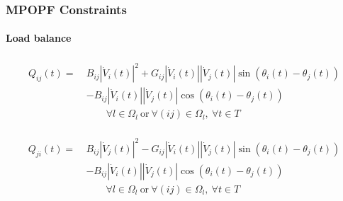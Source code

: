 \documentclass[
	11pt, %
	aspectratio=169, %
]{beamer}
\begin{document}


\begin{frame}
    \frametitle{MPOPF Constraints}
    \framesubtitle{Load balance} %

    \begin{align}
    \label{eq:Mexpr_q_flow_ij}
        \begin{split}
            Q_{ij}(t) =\ &B_{ij}\left\lvert \dot{V}_{i}(t)\right\rvert^{2} + G_{ij}\left\lvert \dot{V}_{i}(t)\right\rvert\left\lvert \dot{V}_{j}(t)\right\rvert \sin{\left(\theta_{i}(t)-\theta_{j}(t)\right)} \\
            &- B_{ij}\left\lvert \dot{V}_{i}(t)\right\rvert\left\lvert \dot{V}_{j}(t)\right\rvert \cos{\left(\theta_{i}(t)-\theta_{j}(t)\right)} \\[1em]
            &\qquad \forall l \in \Omega_{l} \ \text{or} \ \forall (ij) \in \Omega_{l},\ \forall t \in T
        \end{split}
    \end{align}

	\begin{align}
    \label{eq:Mexpr_q_flow_ji}
        \begin{split}
            Q_{ji}(t) =\ &B_{ij}\left\lvert \dot{V}_{j}(t)\right\rvert^{2} - G_{ij}\left\lvert \dot{V}_{i}(t)\right\rvert\left\lvert \dot{V}_{j}(t)\right\rvert \sin{\left(\theta_{i}(t)-\theta_{j}(t)\right)} \\
            &- B_{ij}\left\lvert \dot{V}_{i}(t)\right\rvert\left\lvert \dot{V}_{j}(t)\right\rvert \cos{\left(\theta_{i}(t)-\theta_{j}(t)\right)} \\[1em]
            &\qquad \forall l \in \Omega_{l} \ \text{or} \ \forall (ij) \in \Omega_{l},\ \forall t \in T
        \end{split}
\end{align}

\end{frame}

\end{document}
